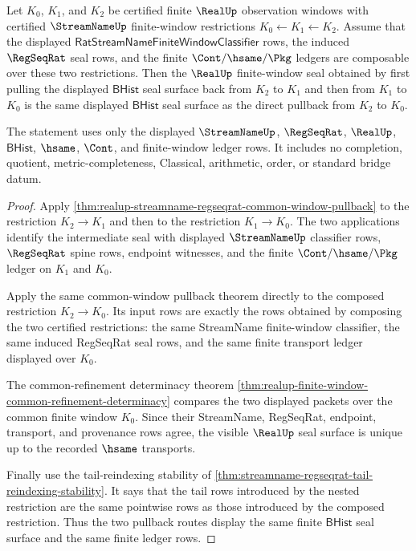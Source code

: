 \begin{theorem}
\label{thm:realup-streamname-regseqrat-cover-seal-associativity}
Let $K_0$, $K_1$, and $K_2$ be certified finite $\RealUp$ observation windows
with certified $\StreamNameUp$ finite-window restrictions
$K_0\leftarrow K_1\leftarrow K_2$. Assume that the displayed
$\mathsf{RatStreamNameFiniteWindowClassifier}$ rows, the induced $\RegSeqRat$
seal rows, and the finite $\Cont/\hsame/\Pkg$ ledgers are composable over these
two restrictions. Then the $\RealUp$ finite-window seal obtained by first
pulling the displayed $\mathsf{BHist}$ seal surface back from $K_2$ to $K_1$ and
then from $K_1$ to $K_0$ is the same displayed $\mathsf{BHist}$ seal surface as
the direct pullback from $K_2$ to $K_0$.

The statement uses only the displayed $\StreamNameUp$, $\RegSeqRat$, $\RealUp$,
$\mathsf{BHist}$, $\hsame$, $\Cont$, and finite-window ledger rows. It includes
no completion, quotient, metric-completeness, Classical, arithmetic, order, or
standard bridge datum.
\end{theorem}
\begin{proof}
Apply \autoref{thm:realup-streamname-regseqrat-common-window-pullback} to the
restriction $K_2\to K_1$ and then to the restriction $K_1\to K_0$. The two
applications identify the intermediate seal with displayed
$\StreamNameUp$ classifier rows, $\RegSeqRat$ spine rows, endpoint witnesses,
and the finite $\Cont/\hsame/\Pkg$ ledger on $K_1$ and $K_0$.

Apply the same common-window pullback theorem directly to the composed
restriction $K_2\to K_0$. Its input rows are exactly the rows obtained by
composing the two certified restrictions: the same StreamName finite-window
classifier, the same induced RegSeqRat seal rows, and the same finite transport
ledger displayed over $K_0$.

The common-refinement determinacy theorem
\autoref{thm:realup-finite-window-common-refinement-determinacy} compares the
two displayed packets over the common finite window $K_0$. Since their
StreamName, RegSeqRat, endpoint, transport, and provenance rows agree, the
visible $\RealUp$ seal surface is unique up to the recorded $\hsame$ transports.

Finally use the tail-reindexing stability of
\autoref{thm:streamname-regseqrat-tail-reindexing-stability}. It says that the
tail rows introduced by the nested restriction are the same pointwise rows as
those introduced by the composed restriction. Thus the two pullback routes
display the same finite $\mathsf{BHist}$ seal surface and the same finite
ledger rows.
\end{proof}

